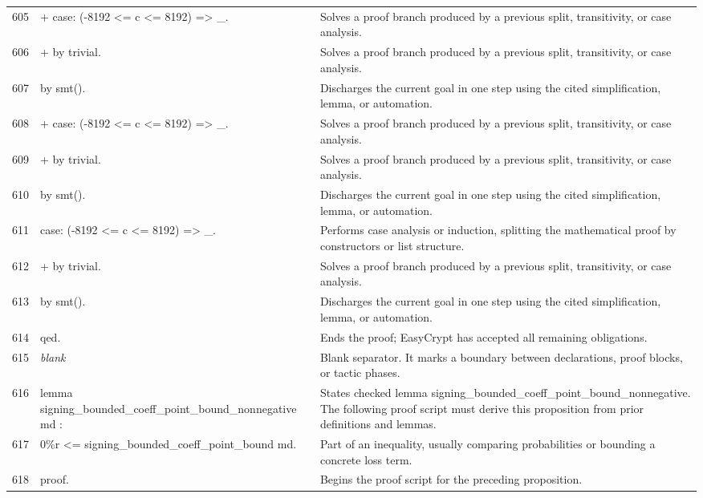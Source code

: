 \documentclass[10pt]{article}
\begin{document}
\begin{longtable}{r L{0.53\textwidth} L{0.37\textwidth}}
605 & {\ttfamily\scriptsize + case: (-8192 <= c <= 8192) => \_.} & Solves a proof branch produced by a previous split, transitivity, or case analysis. \\
606 & {\ttfamily\scriptsize   + by trivial.} & Solves a proof branch produced by a previous split, transitivity, or case analysis. \\
607 & {\ttfamily\scriptsize   by smt().} & Discharges the current goal in one step using the cited simplification, lemma, or automation. \\
608 & {\ttfamily\scriptsize + case: (-8192 <= c <= 8192) => \_.} & Solves a proof branch produced by a previous split, transitivity, or case analysis. \\
609 & {\ttfamily\scriptsize   + by trivial.} & Solves a proof branch produced by a previous split, transitivity, or case analysis. \\
610 & {\ttfamily\scriptsize   by smt().} & Discharges the current goal in one step using the cited simplification, lemma, or automation. \\
611 & {\ttfamily\scriptsize case: (-8192 <= c <= 8192) => \_.} & Performs case analysis or induction, splitting the mathematical proof by constructors or list structure. \\
612 & {\ttfamily\scriptsize + by trivial.} & Solves a proof branch produced by a previous split, transitivity, or case analysis. \\
613 & {\ttfamily\scriptsize by smt().} & Discharges the current goal in one step using the cited simplification, lemma, or automation. \\
614 & {\ttfamily\scriptsize qed.} & Ends the proof; EasyCrypt has accepted all remaining obligations. \\
615 & {\ttfamily\scriptsize \emph{blank}} & Blank separator.  It marks a boundary between declarations, proof blocks, or tactic phases. \\
616 & {\ttfamily\scriptsize lemma signing\_bounded\_coeff\_point\_bound\_nonnegative md :} & States checked lemma signing\_bounded\_coeff\_point\_bound\_nonnegative.  The following proof script must derive this proposition from prior definitions and lemmas. \\
617 & {\ttfamily\scriptsize   0\%r <= signing\_bounded\_coeff\_point\_bound md.} & Part of an inequality, usually comparing probabilities or bounding a concrete loss term. \\
618 & {\ttfamily\scriptsize proof.} & Begins the proof script for the preceding proposition. \\

\end{longtable}
\end{document}
